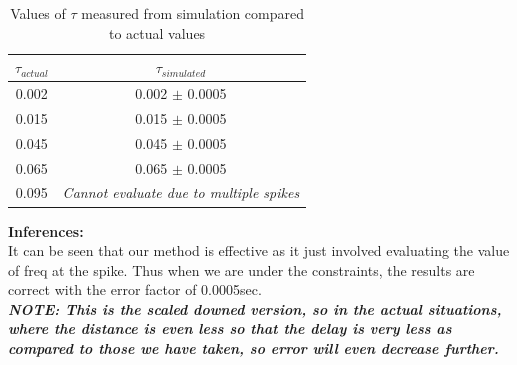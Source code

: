 \documentclass[12pt]{article}
\begin{document}
\begin{table}[!h]
\centering
\begin{tabular}{c|c}
$\tau_{actual}$ & $\tau_{simulated}$ \\\hline
0.002 & 0.002 $\pm$ 0.0005 \\
0.015 & 0.015 $\pm$ 0.0005 \\
0.045 & 0.045 $\pm$ 0.0005 \\
0.065 & 0.065 $\pm$ 0.0005 \\
0.095 & \textit{Cannot evaluate due to multiple spikes  }
\end{tabular}
\caption{\label{Table 2: } Values of $\tau$ measured from simulation compared to actual values}
\end{table}
\textbf{Inferences:}\\
It can be seen that our method is effective as it just involved evaluating the value of freq at the spike.
Thus when we are under the constraints, the results are correct with the error factor of 0.0005sec. \\
\textbf{\textit{NOTE: This is the scaled downed version, so in the actual situations, where the distance is even less so that the delay is very less as compared to those we have taken, so error will even decrease further.}}
\end{document}
